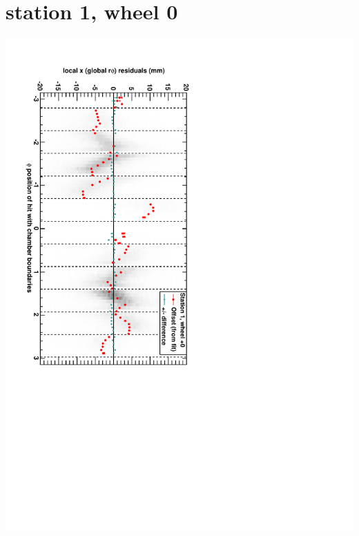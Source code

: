 \documentclass[compress]{beamer}
\begin{document}
\section*{station 1, wheel 0}
\begin{frame} \vfill \mbox{\hspace{-1 cm}\includegraphics[height=1.2\linewidth, angle=90]{DTrphiVsPhi_st1_whC.pdf}} \end{frame}
\end{document}
